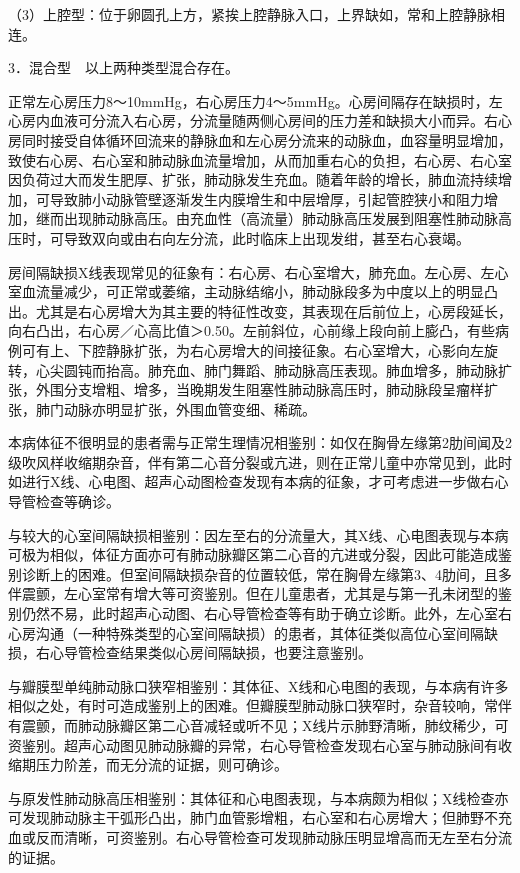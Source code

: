 （3）上腔型：位于卵圆孔上方，紧挨上腔静脉入口，上界缺如，常和上腔静脉相连。

3．混合型　以上两种类型混合存在。

正常左心房压力8～10mmHg，右心房压力4～5mmHg。心房间隔存在缺损时，左心房内血液可分流入右心房，分流量随两侧心房间的压力差和缺损大小而异。右心房同时接受自体循环回流来的静脉血和左心房分流来的动脉血，血容量明显增加，致使右心房、右心室和肺动脉血流量增加，从而加重右心的负担，右心房、右心室因负荷过大而发生肥厚、扩张，肺动脉发生充血。随着年龄的增长，肺血流持续增加，可导致肺小动脉管壁逐渐发生内膜增生和中层增厚，引起管腔狭小和阻力增加，继而出现肺动脉高压。由充血性（高流量）肺动脉高压发展到阻塞性肺动脉高压时，可导致双向或由右向左分流，此时临床上出现发绀，甚至右心衰竭。

房间隔缺损X线表现常见的征象有：右心房、右心室增大，肺充血。左心房、左心室血流量减少，可正常或萎缩，主动脉结缩小，肺动脉段多为中度以上的明显凸出。尤其是右心房增大为其主要的特征性改变，其表现在后前位上，心房段延长，向右凸出，右心房／心高比值＞0.50。左前斜位，心前缘上段向前上膨凸，有些病例可有上、下腔静脉扩张，为右心房增大的间接征象。右心室增大，心影向左旋转，心尖圆钝而抬高。肺充血、肺门舞蹈、肺动脉高压表现。肺血增多，肺动脉扩张，外围分支增粗、增多，当晚期发生阻塞性肺动脉高压时，肺动脉段呈瘤样扩张，肺门动脉亦明显扩张，外围血管变细、稀疏。

本病体征不很明显的患者需与正常生理情况相鉴别：如仅在胸骨左缘第2肋间闻及2级吹风样收缩期杂音，伴有第二心音分裂或亢进，则在正常儿童中亦常见到，此时如进行X线、心电图、超声心动图检查发现有本病的征象，才可考虑进一步做右心导管检查等确诊。

与较大的心室间隔缺损相鉴别：因左至右的分流量大，其X线、心电图表现与本病可极为相似，体征方面亦可有肺动脉瓣区第二心音的亢进或分裂，因此可能造成鉴别诊断上的困难。但室间隔缺损杂音的位置较低，常在胸骨左缘第3、4肋间，且多伴震颤，左心室常有增大等可资鉴别。但在儿童患者，尤其是与第一孔未闭型的鉴别仍然不易，此时超声心动图、右心导管检查等有助于确立诊断。此外，左心室右心房沟通（一种特殊类型的心室间隔缺损）的患者，其体征类似高位心室间隔缺损，右心导管检查结果类似心房间隔缺损，也要注意鉴别。

与瓣膜型单纯肺动脉口狭窄相鉴别：其体征、X线和心电图的表现，与本病有许多相似之处，有时可造成鉴别上的困难。但瓣膜型肺动脉口狭窄时，杂音较响，常伴有震颤，而肺动脉瓣区第二心音减轻或听不见；X线片示肺野清晰，肺纹稀少，可资鉴别。超声心动图见肺动脉瓣的异常，右心导管检查发现右心室与肺动脉间有收缩期压力阶差，而无分流的证据，则可确诊。

与原发性肺动脉高压相鉴别：其体征和心电图表现，与本病颇为相似；X线检查亦可发现肺动脉主干弧形凸出，肺门血管影增粗，右心室和右心房增大；但肺野不充血或反而清晰，可资鉴别。右心导管检查可发现肺动脉压明显增高而无左至右分流的证据。

